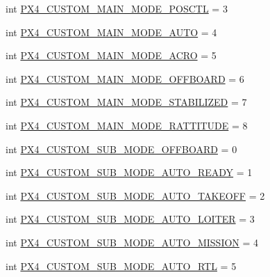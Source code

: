 \begin{DoxyCompactItemize}
int \mbox{\hyperlink{namespacepymavlink_1_1mavutil_a0a679fe2d2967f3271f9232fc014ba1c}{P\+X4\+\_\+\+C\+U\+S\+T\+O\+M\+\_\+\+M\+A\+I\+N\+\_\+\+M\+O\+D\+E\+\_\+\+P\+O\+S\+C\+TL}} = 3
\item 
int \mbox{\hyperlink{namespacepymavlink_1_1mavutil_ae22642fa49006aedb8286cb4583dce00}{P\+X4\+\_\+\+C\+U\+S\+T\+O\+M\+\_\+\+M\+A\+I\+N\+\_\+\+M\+O\+D\+E\+\_\+\+A\+U\+TO}} = 4
\item 
int \mbox{\hyperlink{namespacepymavlink_1_1mavutil_a33881ab88c8163d6242a7f7e6e6dbfc0}{P\+X4\+\_\+\+C\+U\+S\+T\+O\+M\+\_\+\+M\+A\+I\+N\+\_\+\+M\+O\+D\+E\+\_\+\+A\+C\+RO}} = 5
\item 
int \mbox{\hyperlink{namespacepymavlink_1_1mavutil_aea53f0d5955fbf2e82015f41e617d9b7}{P\+X4\+\_\+\+C\+U\+S\+T\+O\+M\+\_\+\+M\+A\+I\+N\+\_\+\+M\+O\+D\+E\+\_\+\+O\+F\+F\+B\+O\+A\+RD}} = 6
\item 
int \mbox{\hyperlink{namespacepymavlink_1_1mavutil_a756f7e47118fb1df232efdd6b2e7adb6}{P\+X4\+\_\+\+C\+U\+S\+T\+O\+M\+\_\+\+M\+A\+I\+N\+\_\+\+M\+O\+D\+E\+\_\+\+S\+T\+A\+B\+I\+L\+I\+Z\+ED}} = 7
\item 
int \mbox{\hyperlink{namespacepymavlink_1_1mavutil_a00da773da139cae86817889b24b157c2}{P\+X4\+\_\+\+C\+U\+S\+T\+O\+M\+\_\+\+M\+A\+I\+N\+\_\+\+M\+O\+D\+E\+\_\+\+R\+A\+T\+T\+I\+T\+U\+DE}} = 8
\item 
int \mbox{\hyperlink{namespacepymavlink_1_1mavutil_a5ae544dde854d8f1476e11e7b4959a7f}{P\+X4\+\_\+\+C\+U\+S\+T\+O\+M\+\_\+\+S\+U\+B\+\_\+\+M\+O\+D\+E\+\_\+\+O\+F\+F\+B\+O\+A\+RD}} = 0
\item 
int \mbox{\hyperlink{namespacepymavlink_1_1mavutil_a337a3187e21fd6434db84f90d30827ae}{P\+X4\+\_\+\+C\+U\+S\+T\+O\+M\+\_\+\+S\+U\+B\+\_\+\+M\+O\+D\+E\+\_\+\+A\+U\+T\+O\+\_\+\+R\+E\+A\+DY}} = 1
\item 
int \mbox{\hyperlink{namespacepymavlink_1_1mavutil_ae9338639eb06f8f785625c6ee23262ef}{P\+X4\+\_\+\+C\+U\+S\+T\+O\+M\+\_\+\+S\+U\+B\+\_\+\+M\+O\+D\+E\+\_\+\+A\+U\+T\+O\+\_\+\+T\+A\+K\+E\+O\+FF}} = 2
\item 
int \mbox{\hyperlink{namespacepymavlink_1_1mavutil_a92f6548114556af652b6b175fb5e44be}{P\+X4\+\_\+\+C\+U\+S\+T\+O\+M\+\_\+\+S\+U\+B\+\_\+\+M\+O\+D\+E\+\_\+\+A\+U\+T\+O\+\_\+\+L\+O\+I\+T\+ER}} = 3
\item 
int \mbox{\hyperlink{namespacepymavlink_1_1mavutil_a153eb422f7f39e3c6e2a32ea13567ecf}{P\+X4\+\_\+\+C\+U\+S\+T\+O\+M\+\_\+\+S\+U\+B\+\_\+\+M\+O\+D\+E\+\_\+\+A\+U\+T\+O\+\_\+\+M\+I\+S\+S\+I\+ON}} = 4
\item 
int \mbox{\hyperlink{namespacepymavlink_1_1mavutil_a4e0ce9b701247e9a35b12a13ec9d2550}{P\+X4\+\_\+\+C\+U\+S\+T\+O\+M\+\_\+\+S\+U\+B\+\_\+\+M\+O\+D\+E\+\_\+\+A\+U\+T\+O\+\_\+\+R\+TL}} = 5

\end{DoxyCompactItemize}
